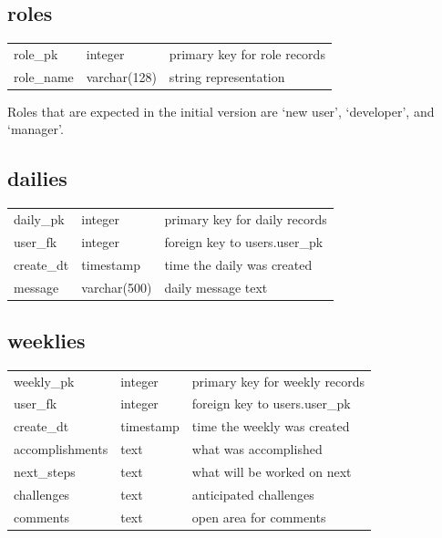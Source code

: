 \subsection*{roles}
\begin{tabular}{l|l|l}
\hline
role\_pk & integer & primary key for role records \\
role\_name & varchar(128) & string representation \\
\hline
\end{tabular}

Roles that are expected in the initial version are `new user', `developer', and `manager'.

\subsection*{dailies}
\begin{tabular}{l|l|l}
\hline
daily\_pk & integer & primary key for daily records \\
user\_fk & integer & foreign key to users.user\_pk \\
create\_dt & timestamp & time the daily was created \\
message & varchar(500) & daily message text \\
\hline
\end{tabular}

\subsection*{weeklies}
\begin{tabular}{l|l|l}
\hline
weekly\_pk & integer & primary key for weekly records \\
user\_fk & integer & foreign key to users.user\_pk \\
create\_dt & timestamp & time the weekly was created \\
accomplishments & text & what was accomplished \\
next\_steps & text & what will be worked on next \\
challenges & text & anticipated challenges \\
comments & text & open area for comments \\
\hline
\end{tabular}

